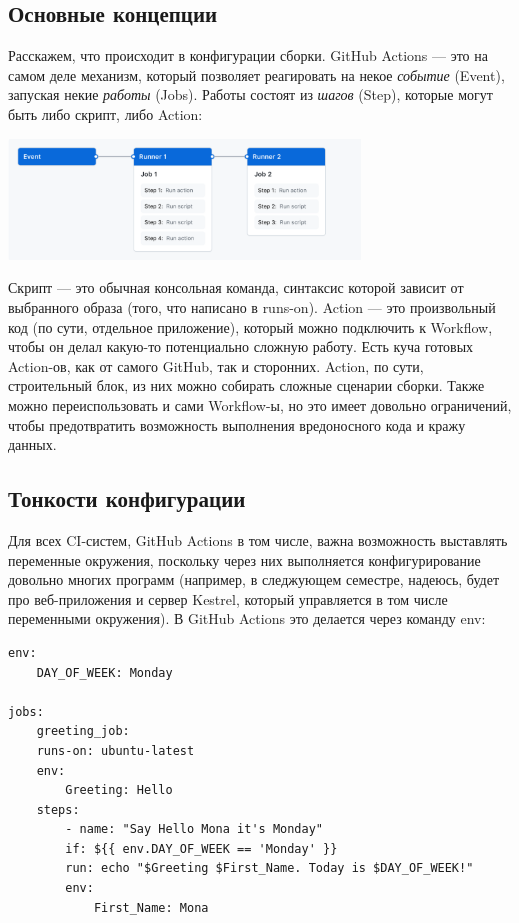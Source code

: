 \documentclass[a5paper]{article}
\begin{document}
\subsection{Основные концепции}

Расскажем, что происходит в конфигурации сборки. GitHub Actions --- это на самом деле механизм, который позволяет реагировать на некое \emph{событие} (Event), запуская некие \emph{работы} (Jobs). Работы состоят из \emph{шагов} (Step), которые могут быть либо скрипт, либо Action:

\begin{center}
    \includegraphics[width=0.7\textwidth]{githubActionsWorkflow.png}
\end{center}

Скрипт --- это обычная консольная команда, синтаксис которой зависит от выбранного образа (того, что написано в runs-on). Action --- это произвольный код (по сути, отдельное приложение), который можно подключить к Workflow, чтобы он делал какую-то потенциально сложную работу. Есть куча готовых Action-ов, как от самого GitHub, так и сторонних. Action, по сути, строительный блок, из них можно собирать сложные сценарии сборки. Также можно переиспользовать и сами Workflow-ы, но это имеет довольно ограничений, чтобы предотвратить возможность выполнения вредоносного кода и кражу данных.

\subsection{Тонкости конфигурации}

Для всех CI-систем, GitHub Actions в том числе, важна возможность выставлять переменные окружения, поскольку через них выполняется конфигурирование довольно многих программ (например, в следжующем семестре, надеюсь, будет про веб-приложения и сервер Kestrel, который управляется в том числе переменными окружения). В GitHub Actions это делается через команду env:

\begin{verbatim}
env:
    DAY_OF_WEEK: Monday

jobs:
    greeting_job:
    runs-on: ubuntu-latest
    env:
        Greeting: Hello
    steps:
        - name: "Say Hello Mona it's Monday"
        if: ${{ env.DAY_OF_WEEK == 'Monday' }}
        run: echo "$Greeting $First_Name. Today is $DAY_OF_WEEK!"
        env:
            First_Name: Mona
\end{verbatim}
\end{document}
